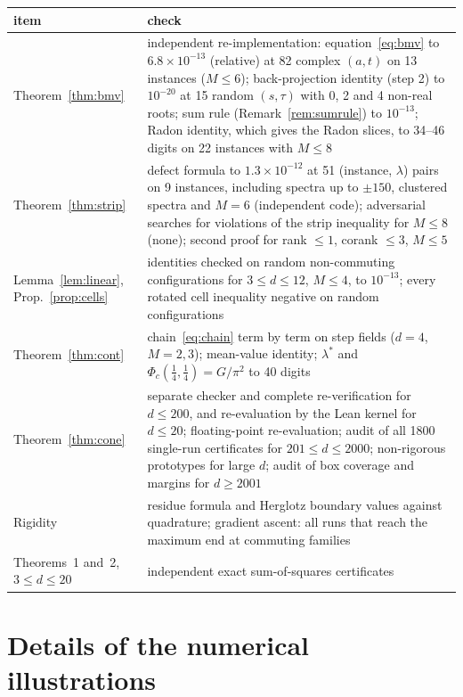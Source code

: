\documentclass[11pt]{amsart}
\theoremstyle{definition}
\theoremstyle{remark}
\numberwithin{equation}{section}
\begin{document}
\begin{center}
\small
\begin{tabular}{>{\raggedright\arraybackslash}p{4.3cm}>{\raggedright\arraybackslash}p{9.8cm}}
\toprule
item & check\\
\midrule
Theorem~\ref{thm:bmv} & independent re-implementation: equation~\eqref{eq:bmv} to $6.8\times10^{-13}$ (relative) at 82
complex $(a,t)$ on 13 instances ($M\le6$); back-projection identity (step 2) to $10^{-20}$ at 15 random $(s,\tau)$ with
0, 2 and 4 non-real roots; sum rule (Remark~\ref{rem:sumrule}) to $10^{-13}$; Radon identity, which gives the Radon
slices, to 34--46 digits on 22 instances with $M\le8$\\
Theorem~\ref{thm:strip} & defect formula to $1.3\times10^{-12}$ at 51 (instance, $\lambda$) pairs on 9 instances,
including spectra up to $\pm150$, clustered spectra and $M=6$ (independent code); adversarial searches for violations
of the strip inequality for $M\le8$ (none); second proof for rank $\le1$, corank $\le3$, $M\le5$\\
Lemma~\ref{lem:linear}, Prop.~\ref{prop:cells} & identities checked on random non-commuting configurations for
$3\le d\le12$, $M\le4$, to $10^{-13}$; every rotated cell inequality negative on random configurations\\
Theorem~\ref{thm:cont} & chain~\eqref{eq:chain} term by term on step fields ($d=4$, $M=2,3$); mean-value identity;
$\lambda^*$ and $\Phi_c(\frac14,\frac14)=G/\pi^2$ to 40 digits\\
Theorem~\ref{thm:cone} & separate checker and complete re-verification for $d\le200$, and re-evaluation by the Lean
kernel for $d\le20$; floating-point re-evaluation; audit of all 1800 single-run certificates for $201\le d\le2000$;
non-rigorous prototypes for large $d$; audit of box coverage and margins for $d\ge2001$\\
Rigidity & residue formula and Herglotz boundary values against quadrature; gradient ascent: all runs that reach the
maximum end at commuting families\\
Theorems~1 and~2, $3\le d\le20$ & independent exact sum-of-squares certificates\cite{repo}\\
\bottomrule
\end{tabular}
\end{center}

\section{Details of the numerical illustrations}\label{sec:figs}
\end{document}
